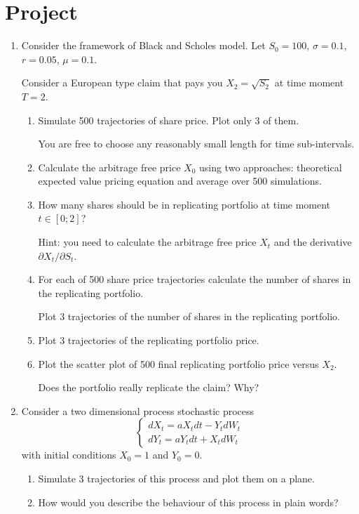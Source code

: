 \documentclass[12pt]{article}
\begin{document}
\section*{Project}

\begin{enumerate}

\item Consider the framework of Black and Scholes model.
Let $S_0 =100$, $\sigma = 0.1$, $r=0.05$, $\mu = 0.1$. 

Consider a European type claim that pays you $X_2 = \sqrt{S_2}$ at time moment $T=2$. 

\begin{enumerate}
    \item Simulate 500 trajectories of share price. Plot only 3 of them.
    
    You are free to choose any reasonably small length for time sub-intervals. 

    \item Calculate the arbitrage free price $X_0$ using two approaches:
    theoretical expected value pricing equation and average over 500 simulations. 

    \item How many shares should be in replicating portfolio at time moment $t \in [0;2]$?
    
    Hint: you need to calculate the arbitrage free price $X_t$ and the derivative $\partial X_t/\partial S_t$. 

    \item For each of 500 share price trajectories calculate the number of shares in the replicating portfolio. 
    
    Plot 3 trajectories of the number of shares in the replicating portfolio. 
    
    \item Plot 3 trajectories of the replicating portfolio price. 
    
    \item Plot the scatter plot of 500 final replicating portfolio price versus $X_2$.
    
    Does the portfolio really replicate the claim? Why?
\end{enumerate}

\item Consider a two dimensional process stochastic process
\[
    \begin{cases}
    dX_t=aX_t dt-Y_t dW_t \\
    dY_t=aY_t dt+X_t dW_t
    \end{cases}
\]
with initial conditions $X_0=1$ and $Y_0=0$.

\begin{enumerate}
    \item Simulate 3 trajectories of this process and plot them on a plane. 
    \item How would you describe the behaviour of this process in plain words?
\end{enumerate}



    
\end{enumerate}
\end{document}
